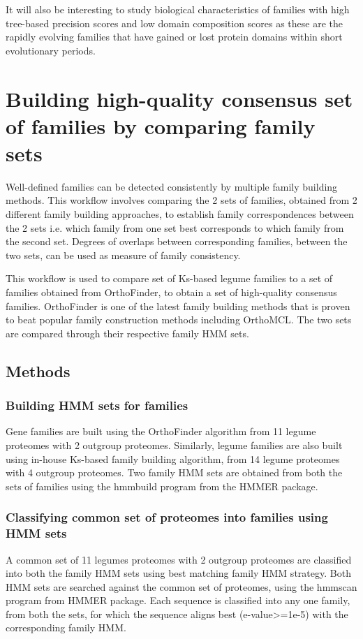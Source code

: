 \documentclass{article}
\begin{document}
	It will also be interesting to study biological characteristics of families with high tree-based precision scores and low domain composition scores as these are the rapidly evolving families that have gained or lost protein domains within short evolutionary periods.
	
	\pagebreak
	\section{Building high-quality consensus set of families by comparing family sets}
	Well-defined families can be detected consistently by multiple family building methods. This workflow involves comparing the 2 sets of families, obtained from 2 different family building approaches, to establish family correspondences between the 2 sets i.e. which family from one set best corresponds to which family from the second set. Degrees of overlaps between corresponding families, between the two sets, can be used as measure of family consistency.
	
	This workflow is used to compare set of Ks-based legume families to a set of families obtained from OrthoFinder, to obtain a set of high-quality consensus families. OrthoFinder is one of the latest family building methods that is proven to beat popular family construction methods including OrthoMCL. The two sets are compared through their respective family HMM sets.
	
		\subsection{Methods}
			\subsubsection{Building HMM sets for families}
			Gene families are built using the OrthoFinder algorithm from 11 legume proteomes with 2 outgroup proteomes. Similarly, legume families are also built using in-house Ks-based family building algorithm, from 14 legume proteomes with 4 outgroup proteomes. Two family HMM sets are obtained from both the sets of families using the hmmbuild program from the HMMER package.
			
			\subsubsection{Classifying common set of proteomes into families using HMM sets}
			A common set of 11 legumes proteomes with 2 outgroup proteomes are classified into both the family HMM sets using best matching family HMM strategy. Both HMM sets are searched against the common set of proteomes, using the hmmscan program from HMMER package. Each sequence is classified into any one family, from both the sets, for which the sequence aligns best (e-value>=1e-5) with the corresponding family HMM.
			
\end{document}
